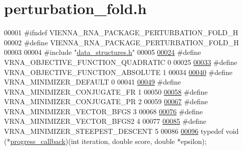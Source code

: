 \hypertarget{perturbation__fold_8h_source}{}\section{perturbation\+\_\+fold.\+h}
\label{perturbation__fold_8h_source}

\begin{DoxyCode}
00001 \textcolor{preprocessor}{#ifndef VIENNA\_RNA\_PACKAGE\_PERTURBATION\_FOLD\_H}
00002 \textcolor{preprocessor}{#define VIENNA\_RNA\_PACKAGE\_PERTURBATION\_FOLD\_H}
00003 
00004 \textcolor{preprocessor}{#include "\hyperlink{data__structures_8h}{data\_structures.h}"}
00005 
\hypertarget{perturbation__fold_8h_source_l00024}{}\hyperlink{group__perturbation_ga81e10993d1ae728e4e02022b33155a12}{00024} \textcolor{preprocessor}{#define VRNA\_OBJECTIVE\_FUNCTION\_QUADRATIC 0}
00025 
\hypertarget{perturbation__fold_8h_source_l00033}{}\hyperlink{group__perturbation_gac070dfb9cafaeb14d5652bd9adf0f6b1}{00033} \textcolor{preprocessor}{#define VRNA\_OBJECTIVE\_FUNCTION\_ABSOLUTE 1}
00034 
\hypertarget{perturbation__fold_8h_source_l00040}{}\hyperlink{group__perturbation_gae5126200d80dbb282f46083fffc606bf}{00040} \textcolor{preprocessor}{#define VRNA\_MINIMIZER\_DEFAULT 0}
00041 
\hypertarget{perturbation__fold_8h_source_l00049}{}\hyperlink{group__perturbation_gab1d89db58e8c497795a5005f5dbc8c4a}{00049} \textcolor{preprocessor}{#define VRNA\_MINIMIZER\_CONJUGATE\_FR 1}
00050 
\hypertarget{perturbation__fold_8h_source_l00058}{}\hyperlink{group__perturbation_ga5aaeafe1b0aa77a5cda18943ff94b02f}{00058} \textcolor{preprocessor}{#define VRNA\_MINIMIZER\_CONJUGATE\_PR 2}
00059 
\hypertarget{perturbation__fold_8h_source_l00067}{}\hyperlink{group__perturbation_ga9be8a702cddf58235571ace11cc41b22}{00067} \textcolor{preprocessor}{#define VRNA\_MINIMIZER\_VECTOR\_BFGS 3}
00068 
\hypertarget{perturbation__fold_8h_source_l00076}{}\hyperlink{group__perturbation_ga7b0a65c6c92fa1d8012383ba9d3dcb4f}{00076} \textcolor{preprocessor}{#define VRNA\_MINIMIZER\_VECTOR\_BFGS2 4}
00077 
\hypertarget{perturbation__fold_8h_source_l00085}{}\hyperlink{group__perturbation_ga9ecd2144c2ebed7533233da3986521b0}{00085} \textcolor{preprocessor}{#define VRNA\_MINIMIZER\_STEEPEST\_DESCENT 5}
00086 
\hypertarget{perturbation__fold_8h_source_l00096}{}\hyperlink{group__perturbation_gaa715397c7afd2d2955c315512a3d571a}{00096} \textcolor{keyword}{typedef} void (*\hyperlink{group__perturbation_gaa715397c7afd2d2955c315512a3d571a}{progress\_callback})(\textcolor{keywordtype}{int} iteration, \textcolor{keywordtype}{double} score, \textcolor{keywordtype}{double} *epsilon);

\end{DoxyCode}
